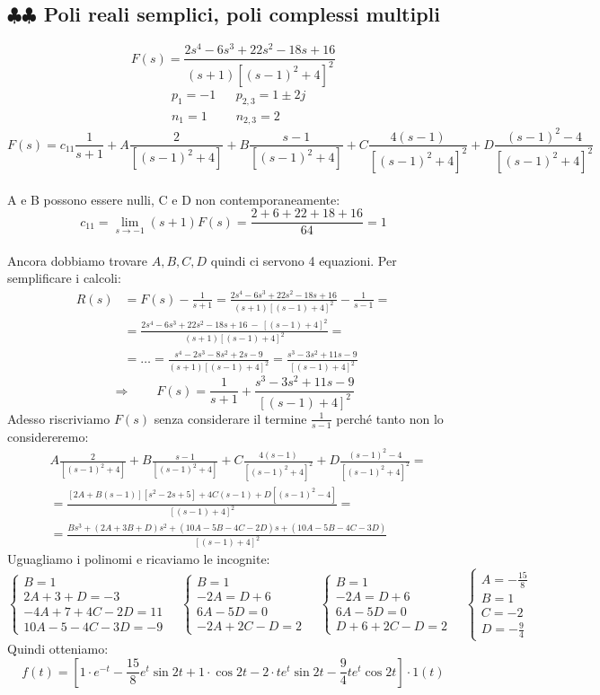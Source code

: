 \subsection{$ \clubsuit\clubsuit $ Poli reali semplici, poli complessi multipli}
\[ F(s) = \frac{2s^4-6s^3+22s^2-18s+16}{(s+1)[(s-1)^2+4]^2} \]
\begin{align*}
	& p_1=-1 && p_{2,3} = 1 \pm 2j\\
	& n_1=1  && n_{2,3} = 2
\end{align*}
\[ F(s) = c_{11} \frac{1}{s+1} + A \frac{2}{[(s-1)^2+4]} + B \frac{s-1}{[(s-1)^2+4]} + C \frac{4(s-1)}{[(s-1)^2+4]^2} + D \frac{(s-1)^2-4}{[(s-1)^2+4]^2} \]\\
\medskip
A e B possono essere nulli, C e D non contemporaneamente:
\[ c_{11} = \lim\limits_{s \rightarrow -1} (s+1)F(s) = \frac{2+6+22+18+16}{64} = 1 \]\\
\medskip
Ancora dobbiamo trovare $ A, B, C, D $ quindi ci servono 4 equazioni. Per semplificare i calcoli:
\begin{align*}
	R(s) &= F(s) - \frac{1}{s+1} = \frac{2s^4-6s^3+22s^2-18s+16}{(s+1)[(s-1)+4]^2} - \frac{1}{s-1} =\\
	&= \frac{2s^4-6s^3+22s^2-18s+16\ -\ [(s-1)+4]^2}{(s+1)[(s-1)+4]^2} =\\
	&= \dots = \frac{s^4-2s^3-8s^2+2s-9}{(s+1)[(s-1)+4]^2} = \frac{s^3-3s^2+11s-9}{[(s-1)+4]^2}
\end{align*}
\[ \Rightarrow \qquad F(s) = \frac{1}{s+1} + \frac{s^3-3s^2+11s-9}{[(s-1)+4]^2} \]
Adesso riscriviamo $ F(s) $ senza considerare il termine $ \frac{1}{s-1} $ perch\'{e} tanto non lo considereremo:
\begin{align*}
	&A \frac{2}{[(s-1)^2+4]} + B \frac{s-1}{[(s-1)^2+4]} + C \frac{4(s-1)}{[(s-1)^2+4]^2} + D \frac{(s-1)^2-4}{[(s-1)^2+4]^2} =\\
	&= \frac{[2A+B(s-1)][s^2-2s+5] + 4C(s-1) + D[(s-1)^2-4]}{[(s-1)+4]^2} =\\
	&= \frac{Bs^3 + (2A+3B+D)s^2 + (10A-5B-4C-2D)s + (10A-5B-4C-3D)}{[(s-1)+4]^2}
\end{align*}
Uguagliamo i polinomi e ricaviamo le incognite:
\[ 
\begin{cases}
	B = 1\\
	2A + 3 + D = -3\\
	-4A + 7 + 4C - 2D = 11\\
	10A - 5 - 4C - 3D = -9
\end{cases} \quad
\begin{cases}
	B=1\\
	-2A=D+6\\
	6A-5D=0\\
	-2A+2C-D=2
\end{cases} \quad
\begin{cases}
	B=1\\
	-2A=D+6\\
	6A-5D=0\\
	D+6+2C-D=2
\end{cases} \quad
\begin{cases}
	A=-\frac{15}{8}\\
	B=1\\
	C=-2\\
	D=-\frac{9}{4}
\end{cases} \quad
\]
Quindi otteniamo:
\[ f(t) = [1 \cdot e^{-t} -\frac{15}{8} e^t \sin2t + 1 \cdot \cos2t -2 \cdot t e^t \sin2t -\frac{9}{4} t e^t \cos2t] \cdot 1(t) \]